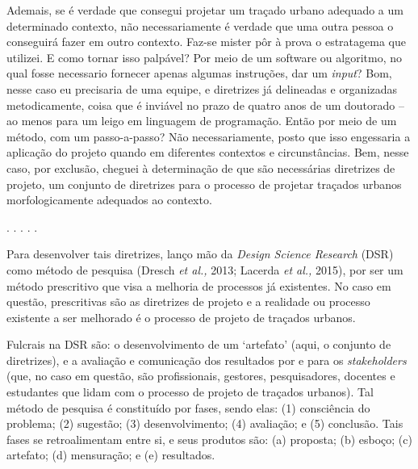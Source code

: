\documentclass[]{report}
\begin{document}
	Ademais, se é verdade que consegui projetar um traçado urbano adequado a um determinado contexto, não necessariamente é verdade que uma outra pessoa o conseguirá fazer em outro contexto. Faz-se mister pôr à prova o estratagema que utilizei. E como tornar isso palpável? Por meio de um software ou algoritmo, no qual fosse necessario fornecer apenas algumas instruções, dar um \textit{input}? Bom, nesse caso eu precisaria de uma equipe, e diretrizes já delineadas e organizadas metodicamente, coisa que é inviável no prazo de quatro anos de um doutorado – ao menos para um leigo em linguagem de programação. Então por meio de um método, com um passo-a-passo? Não necessariamente, posto que isso engessaria a aplicação do projeto quando em diferentes contextos e circunstâncias. Bem, nesse caso, por exclusão, cheguei à determinação de que são necessárias diretrizes de projeto, um conjunto de diretrizes para o processo de projetar traçados urbanos morfologicamente adequados ao contexto. 

	\begin{center}
		. . . . .
	\end{center}

	Para desenvolver tais diretrizes, lanço mão da \textit{Design Science Research} (DSR) como método de pesquisa (Dresch \textit{et al.,} 2013; Lacerda \textit{et al.,} 2015), por ser um método prescritivo que visa a melhoria de processos já existentes. No caso em questão, prescritivas são as diretrizes de projeto e a realidade ou processo existente a ser melhorado é o processo de projeto de traçados urbanos. 

	
	
	Fulcrais na DSR são: o desenvolvimento de um `artefato' (aqui, o conjunto de diretrizes), e a avaliação e comunicação dos resultados por e para os \textit{stakeholders} (que, no caso em questão, são profissionais, gestores, pesquisadores, docentes e estudantes que lidam com o processo de projeto de traçados urbanos). Tal método de pesquisa é constituído por fases, sendo elas: (1) consciência do problema; (2) sugestão; (3) desenvolvimento; (4) avaliação; e (5) conclusão. Tais fases se retroalimentam entre si, e seus produtos são: (a) proposta; (b) esboço; (c) artefato; (d) mensuração; e (e) resultados.
	
\end{document}

